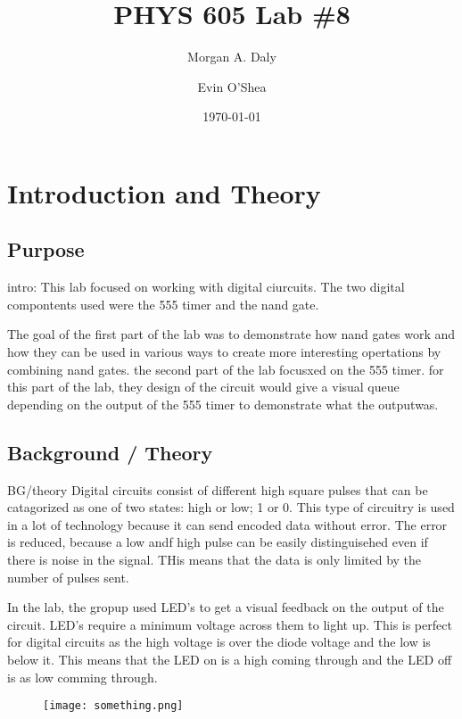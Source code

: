 \documentclass[twocolumn, amsmath]{revtex4}
\begin{document}
\title{PHYS 605 Lab \#8} 

\author{Morgan A. Daly}
\author{Evin O'Shea}
\date{\today} 


\maketitle


\section{Introduction and Theory}
\subsection{Purpose}
intro:
This lab focused on working with digital ciurcuits. The two digital compontents used were the 555 timer and the nand gate. 

The goal of the first part of the lab was to demonstrate how nand gates work and how they can be used in various ways to create more interesting opertations by combining nand gates. 
the second part of the lab focusxed on the 555 timer. for this part of the lab, they design of the circuit would give a visual queue depending on the output of the 555 timer to demonstrate what the outputwas.



\subsection{Background / Theory}


BG/theory 
Digital circuits consist of different high square pulses that can be catagorized as one of two states: high or low; 1 or 0. This type of circuitry is used in a lot of technology because it can send encoded data without error. The error is reduced, because a low andf high pulse can be easily distinguisehed even if there is noise in the signal. THis means that the data is only limited by the number of pulses sent.

In the lab, the gropup used LED's to get a visual feedback on the output of the circuit. 
LED's require a minimum voltage across them to light up. This is perfect for digital circuits as the high voltage is over the diode voltage and the low is below it. This means that the LED on is a high coming through and the LED off is as low comming through.

\begin{figure}[h]
    \texttt{[image: something.png]}  
    \caption{}
\end{figure}
\end{document}
